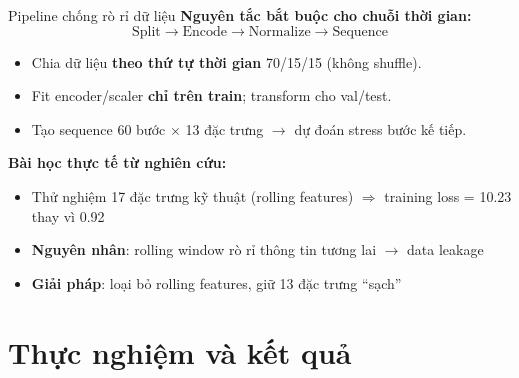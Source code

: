 \documentclass[11pt]{beamer}
\begin{document}
\begin{frame}{Pipeline chống rò rỉ dữ liệu}
\small
\textbf{Nguyên tắc bắt buộc cho chuỗi thời gian:}
\[
\boxed{\text{Split} \rightarrow \text{Encode} \rightarrow \text{Normalize} \rightarrow \text{Sequence}}
\]

\begin{itemize}
    \item Chia dữ liệu \textbf{theo thứ tự thời gian} 70/15/15 (không shuffle).
    \item Fit encoder/scaler \textbf{chỉ trên train}; transform cho val/test.
    \item Tạo sequence 60 bước $\times$ 13 đặc trưng $\rightarrow$ dự đoán stress bước kế tiếp.
\end{itemize}

\vspace{0.1cm}
\textbf{Bài học thực tế từ nghiên cứu:}
\begin{itemize}
    \item Thử nghiệm 17 đặc trưng kỹ thuật (rolling features) $\Rightarrow$ \textcolor{alertred}{training loss = 10.23} thay vì 0.92
    \item \textbf{Nguyên nhân}: rolling window rò rỉ thông tin tương lai $\rightarrow$ data leakage
    \item \textbf{Giải pháp}: loại bỏ rolling features, giữ 13 đặc trưng ``sạch''
\end{itemize}
\end{frame}

\section{Thực nghiệm và kết quả}

\end{document}
